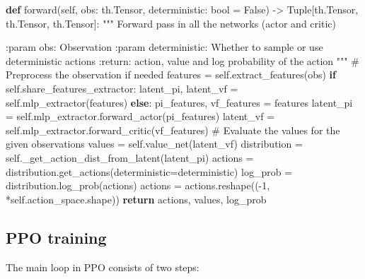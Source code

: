 \documentclass[
  letterpaper,
  DIV=11,
  numbers=noendperiod]{scrartcl}
\newenvironment{Shaded}{\begin{snugshade}}{\end{snugshade}}
\newcommand{\BuiltInTok}[1]{\textcolor[rgb]{0.00,0.23,0.31}{#1}}
\newcommand{\CommentTok}[1]{\textcolor[rgb]{0.37,0.37,0.37}{#1}}
\newcommand{\ControlFlowTok}[1]{\textcolor[rgb]{0.00,0.23,0.31}{\textbf{#1}}}
\newcommand{\DecValTok}[1]{\textcolor[rgb]{0.68,0.00,0.00}{#1}}
\newcommand{\KeywordTok}[1]{\textcolor[rgb]{0.00,0.23,0.31}{\textbf{#1}}}
\newcommand{\NormalTok}[1]{\textcolor[rgb]{0.00,0.23,0.31}{#1}}
\newcommand{\OperatorTok}[1]{\textcolor[rgb]{0.37,0.37,0.37}{#1}}
\newcommand{\VariableTok}[1]{\textcolor[rgb]{0.07,0.07,0.07}{#1}}
\begin{document}
\begin{Shaded}
\begin{Highlighting}[]
\KeywordTok{def}\NormalTok{ forward(}\VariableTok{self}\NormalTok{, obs: th.Tensor, deterministic: }\BuiltInTok{bool} \OperatorTok{=} \VariableTok{False}\NormalTok{) }\OperatorTok{{-}\textgreater{}}\NormalTok{ Tuple[th.Tensor, th.Tensor, th.Tensor]:}
    \CommentTok{"""}
\CommentTok{    Forward pass in all the networks (actor and critic)}

\CommentTok{    :param obs: Observation}
\CommentTok{    :param deterministic: Whether to sample or use deterministic actions}
\CommentTok{    :return: action, value and log probability of the action}
\CommentTok{    """}
    \CommentTok{\# Preprocess the observation if needed}
\NormalTok{    features }\OperatorTok{=} \VariableTok{self}\NormalTok{.extract\_features(obs)}
    \ControlFlowTok{if} \VariableTok{self}\NormalTok{.share\_features\_extractor:}
\NormalTok{        latent\_pi, latent\_vf }\OperatorTok{=} \VariableTok{self}\NormalTok{.mlp\_extractor(features)}
    \ControlFlowTok{else}\NormalTok{:}
\NormalTok{        pi\_features, vf\_features }\OperatorTok{=}\NormalTok{ features}
\NormalTok{        latent\_pi }\OperatorTok{=} \VariableTok{self}\NormalTok{.mlp\_extractor.forward\_actor(pi\_features)}
\NormalTok{        latent\_vf }\OperatorTok{=} \VariableTok{self}\NormalTok{.mlp\_extractor.forward\_critic(vf\_features)}
    \CommentTok{\# Evaluate the values for the given observations}
\NormalTok{    values }\OperatorTok{=} \VariableTok{self}\NormalTok{.value\_net(latent\_vf)}
\NormalTok{    distribution }\OperatorTok{=} \VariableTok{self}\NormalTok{.\_get\_action\_dist\_from\_latent(latent\_pi)}
\NormalTok{    actions }\OperatorTok{=}\NormalTok{ distribution.get\_actions(deterministic}\OperatorTok{=}\NormalTok{deterministic)}
\NormalTok{    log\_prob }\OperatorTok{=}\NormalTok{ distribution.log\_prob(actions)}
\NormalTok{    actions }\OperatorTok{=}\NormalTok{ actions.reshape((}\OperatorTok{{-}}\DecValTok{1}\NormalTok{, }\OperatorTok{*}\VariableTok{self}\NormalTok{.action\_space.shape))}
    \ControlFlowTok{return}\NormalTok{ actions, values, log\_prob}
\end{Highlighting}
\end{Shaded}

\subsection{PPO training}\label{ppo-training}

The main loop in PPO consists of two steps:
\end{document}
